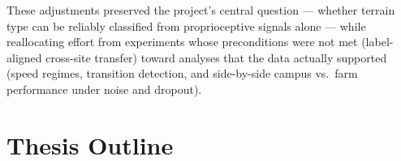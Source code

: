 These adjustments preserved the project's central question — whether terrain
type can be reliably classified from proprioceptive signals alone — while
reallocating effort from experiments whose preconditions were not met
(label-aligned cross-site transfer) toward analyses that the data actually
supported (speed regimes, transition detection, and side-by-side campus vs.\
farm performance under noise and dropout).



\section{Thesis Outline}
